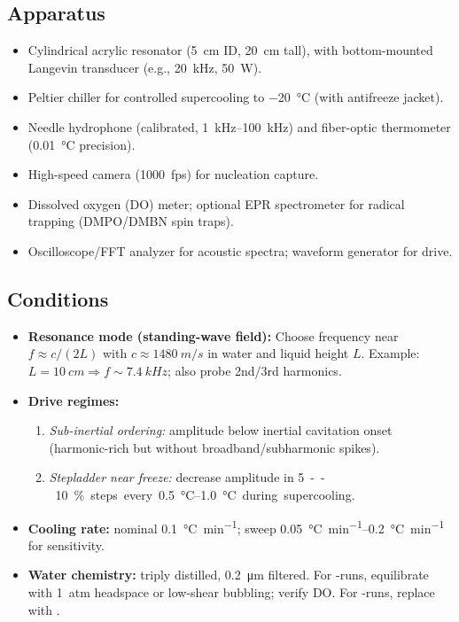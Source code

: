 \documentclass[12pt,oneside]{memoir}
\theoremstyle{plain}
\theoremstyle{definition}
\theoremstyle{remark}
\begin{document}
\subsection*{Apparatus}
\begin{itemize}[leftmargin=1.2em]
  \item Cylindrical acrylic resonator (\SI{5}{cm} ID, \SI{20}{cm} tall), with bottom-mounted Langevin transducer (e.g., \SI{20}{kHz}, \SI{50}{W}).
  \item Peltier chiller for controlled supercooling to \SI{-20}{\celsius} (with antifreeze jacket).
  \item Needle hydrophone (calibrated, \SIrange{1}{100}{kHz}) and fiber-optic thermometer (\SI{0.01}{\celsius} precision).
  \item High-speed camera (\SI{1000}{fps}) for nucleation capture.
  \item Dissolved oxygen (DO) meter; optional EPR spectrometer for radical trapping (DMPO/DMBN spin traps).
  \item Oscilloscope/FFT analyzer for acoustic spectra; waveform generator for drive.
\end{itemize}

\subsection*{Conditions}
\begin{itemize}[leftmargin=1.2em]
  \item \textbf{Resonance mode (standing-wave field):} Choose frequency near \( f \approx c/(2L) \) with \( c \approx \SI{1480}{m/s} \) in water and liquid height \(L\). Example: \(L=\SI{10}{cm} \Rightarrow f\sim \SI{7.4}{kHz}\); also probe 2nd/3rd harmonics.
  \item \textbf{Drive regimes:} 
    \begin{enumerate}[label=\alph*)]
      \item \emph{Sub-inertial ordering:} amplitude below inertial cavitation onset (harmonic-rich but without broadband/subharmonic spikes).
      \item \emph{Stepladder near freeze:} decrease amplitude in \SI{5}--\SI{10}{\%} steps every \SIrange{0.5}{1.0}{\celsius} during supercooling.
    \end{enumerate}
  \item \textbf{Cooling rate:} nominal \SI{0.1}{\celsius\per\minute}; sweep \SIrange{0.05}{0.2}{\celsius\per\minute} for sensitivity.
  \item \textbf{Water chemistry:} triply distilled, \SI{0.2}{\micro m} filtered. For -runs, equilibrate with \SI{1}{atm}  headspace or low-shear bubbling; verify DO. For -runs, replace with .
\end{itemize}
\end{document}
